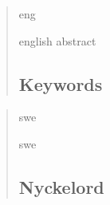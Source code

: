 \documentclass[
english,                 %
bibtex,                  %
includeExtraAbstracts, %
]{kththesis}
\numberwithin{listing}{chapter}
\begin{document}
%

\kthcover
\clearpage\thispagestyle{empty}\mbox{} %
\titlepage

\bookinfopage

\frontmatter
\setcounter{page}{1}
\begin{abstract}
  \markboth{\abstractname}{}
\begin{scontents}[store-env=lang]
eng
\end{scontents}

\begin{scontents}[store-env=abstracts,print-env=true]
english abstract
\end{scontents}

\subsection*{Keywords}
\begin{scontents}[store-env=keywords,print-env=true]
\end{scontents}
\end{abstract}
\cleardoublepage
{}
\begin{abstract}
    \markboth{\abstractname}{}
\begin{scontents}[store-env=lang]
swe
\end{scontents}

\begin{scontents}[store-env=abstracts,print-env=true]
swe
\end{scontents}

\subsection*{Nyckelord}
\begin{scontents}[store-env=keywords,print-env=true]
\end{scontents}
\end{abstract}
\cleardoublepage
{}
\end{document}
